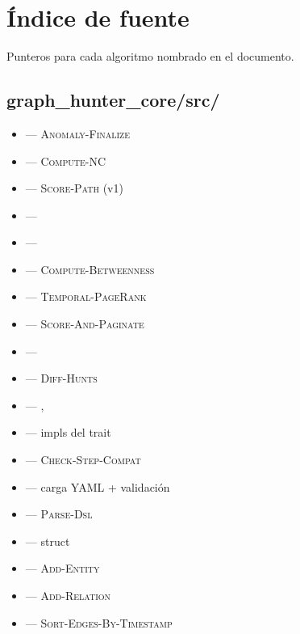 \chapter{Índice de fuente}
\label{app:source}

Punteros  para cada algoritmo nombrado en el
documento.

\section{graph\_hunter\_core/src/}

\begin{itemize}\setlength{\itemsep}{0pt}
    \item {} --- \textsc{Anomaly-Finalize}
    \item {} --- \textsc{Compute-NC}
    \item {} --- \textsc{Score-Path} (v1)
    \item {} --- 
    \item {} --- 
    \item {} --- \textsc{Compute-Betweenness}
    \item {} --- \textsc{Temporal-PageRank}
    \item {} --- \textsc{Score-And-Paginate}
    \item {} --- 
    \item {} --- \textsc{Diff-Hunts}
    \item {} --- , 
    \item {} --- impls del trait
    \item {} --- \textsc{Check-Step-Compat}
    \item {} --- carga YAML + validación
    \item {} --- \textsc{Parse-Dsl}
    \item {} --- struct \Graph{}
    \item {} --- \textsc{Add-Entity}
    \item {} --- \textsc{Add-Relation}
    \item {} --- \textsc{Sort-Edges-By-Timestamp}

\end{itemize}
